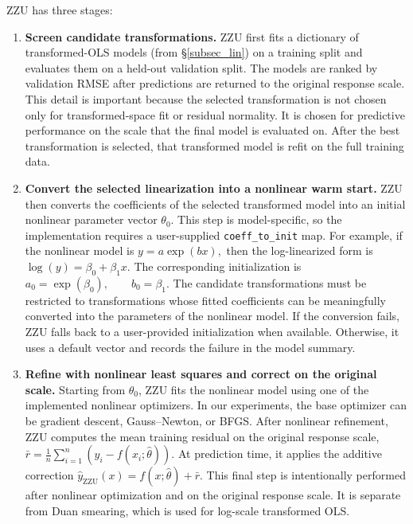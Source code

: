 \documentclass[11pt]{article}
\begin{document}
ZZU has three stages:
\begin{enumerate}[leftmargin=1.5em, itemsep=0.3em, topsep=0.3em]
    \item \textbf{Screen candidate transformations.}
    ZZU first fits a dictionary of transformed-OLS models (from \S\ref{subsec_lin}) on a training split and evaluates them on a held-out validation split. The models are ranked by validation RMSE after predictions are returned to the original response scale. This detail is important because the selected transformation is not chosen only for transformed-space fit or residual normality. It is chosen for predictive performance on the scale that the final model is evaluated on. After the best transformation is selected, that transformed model is refit on the full training data.

    \item \textbf{Convert the selected linearization into a nonlinear warm start.}
    ZZU then converts the coefficients of the selected transformed model into an initial nonlinear parameter vector \(\theta_0\). This step is model-specific, so the implementation requires a user-supplied \texttt{coeff\_to\_init} map. For example, if the nonlinear model is $y = a\exp(bx),
    $
    then the log-linearized form is $\log(y) = \beta_0 + \beta_1 x.$
    The corresponding initialization is $
        a_0 = \exp(\beta_0),
        \qquad
        b_0 = \beta_1.
    $
    The candidate transformations must be restricted to transformations whose fitted coefficients can be meaningfully converted into the parameters of the nonlinear model. If the conversion fails, ZZU falls back to a user-provided initialization when available. Otherwise, it uses a default vector and records the failure in the model summary.

    \item \textbf{Refine with nonlinear least squares and correct on the original scale.}
    Starting from \(\theta_0\), ZZU fits the nonlinear model using one of the implemented nonlinear optimizers. In our experiments, the base optimizer can be gradient descent, Gauss--Newton, or BFGS. After nonlinear refinement, ZZU computes the mean training residual on the original response scale,
    $
        \bar{r}
        =
        \frac{1}{n}\sum_{i=1}^{n}
        \left(y_i - f(x_i;\widehat{\theta})\right).
    $
    At prediction time, it applies the additive correction
    $
        \widehat{y}_{\text{ZZU}}(x)
        =
        f(x;\widehat{\theta}) + \bar{r}.
    $
    This final step is intentionally performed after nonlinear optimization and on the original response scale. It is separate from Duan smearing, which is used for log-scale transformed OLS.
\end{enumerate}
\end{document}
